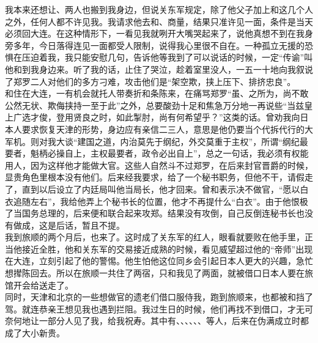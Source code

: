 我本来还想让、两人也搬到我身边，但说关东军规定，除了他父子加上和这几个人之外，任何人都不许见我。我请求他去和、商量，结果只准许见一面，条件是当天必须回大连。在这种情形下，一看见我就咧开大嘴哭起来了，说他真想不到在我身旁多年，今日落得连见一面都受人限制，说得我心里很不自在。一种孤立无援的恐惧在压迫着我，我只能安慰几句，告诉他等我到了可以说话的时候，一定“传谕”叫他和到我身边来。听了我的话，止住了哭泣，趁着室里没人，一五一十地向我叙说了郑罗二人对他们的多方刁难，攻击他们是“架空欺，挟上压下、排挤忠良”。\\

和住在大连，一有机会就托人带奏折和条陈来，在痛骂郑罗“虽、之所为，尚不敢公然无状、欺侮挟持一至于此”之外，总要酸劲十足和焦急万分地一再说些“当兹皇上广选才俊，登用贤良之时，如此掣肘，尚有何希望乎？”这类的话。曾劝我向日本人要求恢复天津的形势，身边应有亲信二三人，意思是他仍要当个代拆代行的大军机。则对我大谈“建国之道，内治莫先于纲纪，外交莫重于主权”，所谓“纲纪最要者，魁柄必操自上，主权最要者，政令必出自上”，总之一句话，我必须有权能用人，因为这样他才能做大官。这些人自然斗不过郑罗，在后来封官晋爵的时候，显贵角色里根本没有他们。后来经我要求，给了一个秘书职务，但他不干，请假走了，直到以后设立了内廷局叫他当局长，他才回来。曾和表示决不做官，“愿以白衣追随左右”，我给他弄上个秘书长的位置，他才不再提什么“白衣”。由于他恨极了当国务总理的，后来便和联合起来攻郑。结果没有攻倒，自己反倒连秘书长也没有做成，这是后话，暂且不提。\\

我到旅顺的两个月后，也来了。这时成了关东军的红人，眼看就要败在他手里，正当他接近全胜，他和关东军的交易接近成熟的时候，看见威望超过他的“帝师”出现在大连，立刻引起了他的警惕。他生怕他这位同乡会引起日本人更大的兴趣，急忙想撵陈回去。所以在旅顺一共住了两宿，只和我见了两面，就被借口日本人要在旅馆开会给送走了。\\

同时，天津和北京的一些想做官的遗老们借口服侍我，跑到旅顺来，也都被和挡了驾。就连恭亲王想见我也遇到拦阻。我过生日的时候，他们再找不到借口，才无可奈何地让一部分人见了我，给我祝寿。其中有、、、、、、等人，后来在伪满成立时都成了大小新贵。\\


